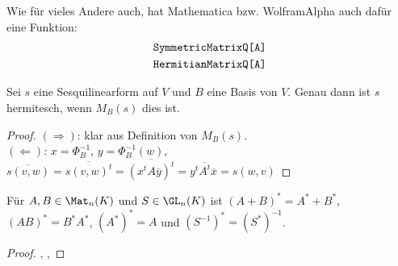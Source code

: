 \begin{mathematica}
	Wie für vieles Andere auch, hat Mathematica bzw. WolframAlpha auch dafür eine Funktion:
	\begin{align}
		\texttt{SymmetricMatrixQ[A]}\notag \\
		\texttt{HermitianMatrixQ[A]}\notag
	\end{align}
\end{mathematica}

\begin{proposition}
	Sei $s$ eine Sesquilinearform auf $V$ und $B$ eine Basis von $V$. Genau dann ist $s$ hermitesch, wenn $M_B(s)$ dies ist.
\end{proposition}
\begin{proof}
	$(\Rightarrow)$: klar aus Definition von $M_B(s)$. \\
	$(\Leftarrow)$: $x=\Phi_B^{-1}$, $y=\Phi_B^{-1}(w)$, $\overline{s(v,w)}=\overline{s(v,w)^t}=\overline{(x^tA\overline{y})^t}=y^t\overline{A^t}\overline{x}=s(w,v)$
\end{proof}

\begin{proposition}
	Für $A,B\in\Mat_n(K)$ und $S\in\GL_n(K)$ ist $(A+B)^*=A^*+B^*$, $(AB)^*=B^*A^*$, $(A^*)^*=A$ und $(S^{-1})^*=(S^*)^{-1}$.
\end{proposition}
\begin{proof}
	, , 
\end{proof}